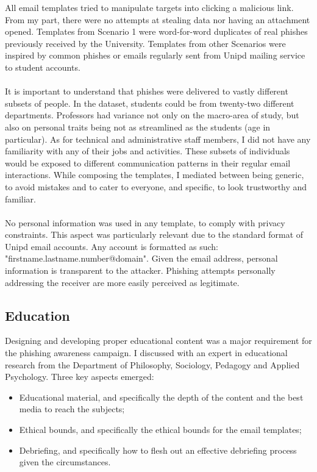 \documentclass[a4paper]{article}
\begin{document}
\noindent
All email templates tried to manipulate targets into clicking a malicious link. From my part, there were no attempts at stealing data nor having an attachment opened. Templates from Scenario 1 were word-for-word duplicates of real phishes previously received by the University. Templates from other Scenarios were inspired by common phishes or emails regularly sent from Unipd mailing service to student accounts. 
\\ \\
It is important to understand that phishes were delivered to vastly different subsets of people. In the dataset, students could be from twenty-two different departments. Professors had variance not only on the macro-area of study, but also on personal traits being not as streamlined as the students (age in particular). As for technical and administrative staff members, I did not have any familiarity with any of their jobs and activities. These subsets of individuals would be exposed to different communication patterns in their regular email interactions. While composing the templates, I mediated between being generic, to avoid mistakes and to cater to everyone, and specific, to look trustworthy and familiar.
\\ \\
No personal information was used in any template, to comply with privacy constraints. This aspect was particularly relevant due to the standard format of Unipd email accounts. Any account is formatted as such: "{firstname}.{lastname}.{number}@domain". Given the email address, personal information is transparent to the attacker. Phishing attempts personally addressing the receiver are more easily perceived as legitimate.

\subsection{Education}

Designing and developing proper educational content was a major requirement for the phishing awareness campaign. I discussed with an expert in educational research from the Department of Philosophy, Sociology, Pedagogy and Applied Psychology. Three key aspects emerged:

\begin{itemize}
    \item Educational material, and specifically the depth of the content and the best media to reach the subjects;
    \item Ethical bounds, and specifically the ethical bounds for the email templates;
    \item Debriefing, and specifically how to flesh out an effective debriefing process given the circumstances.
\end{itemize}
\end{document}
